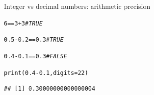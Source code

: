 \documentclass[xcolor=table,           xcolor=dvipsnames]{beamer}\usepackage[]{graphicx}\usepackage[]{color}
\makeatletter
\newcommand{\hlnum}[1]{\textcolor[rgb]{0,0,0}{#1}}
\newcommand{\hlcom}[1]{\textcolor[rgb]{0,0.392,0}{\textit{#1}}}
\newcommand{\hlopt}[1]{\textcolor[rgb]{0,0,0}{#1}}
\newcommand{\hlstd}[1]{\textcolor[rgb]{0,0,0}{#1}}
\newcommand{\hlkwc}[1]{\textcolor[rgb]{1,0,1}{#1}}
\newcommand{\hlkwd}[1]{\textcolor[rgb]{0,0,1}{#1}}
\newenvironment{kframe}{%
 \def\at@end@of@kframe{}%
 \ifinner\ifhmode%
  \def\at@end@of@kframe{\end{minipage}}%
  \begin{minipage}{\columnwidth}%
 \fi\fi%
 \def\FrameCommand##1{\hskip\@totalleftmargin \hskip-\fboxsep
 \colorbox{shadecolor}{##1}\hskip-\fboxsep
     \hskip-\linewidth \hskip-\@totalleftmargin \hskip\columnwidth}%
 \MakeFramed {\advance\hsize-\width
   \@totalleftmargin\z@ \linewidth\hsize
   \@setminipage}}%
 {\par\unskip\endMakeFramed%
 \at@end@of@kframe}
\newenvironment{knitrout}{}{} %
\makeatother
\begin{document}

\begin{frame}[fragile]{Integer vs decimal numbers: arithmetic precision}
\label{intnum}
\vspace{-1em}
\begin{knitrout}
\color{fgcolor}\begin{kframe}
\begin{alltt}
\hlnum{6}  \hlopt{==}  \hlnum{3} \hlopt{+} \hlnum{3}          \hlcom{# TRUE}
\end{alltt}
\end{kframe}
\end{knitrout}
\pause
\vspace{-1em}
\begin{knitrout}
\color{fgcolor}\begin{kframe}
\begin{alltt}
\hlnum{0.5} \hlopt{-} \hlnum{0.2}  \hlopt{==}  \hlnum{0.3}    \hlcom{# TRUE}
\end{alltt}
\end{kframe}
\end{knitrout}
\vspace{-1em}
\pause
\begin{knitrout}
\color{fgcolor}\begin{kframe}
\begin{alltt}
\hlnum{0.4} \hlopt{-} \hlnum{0.1}  \hlopt{==}  \hlnum{0.3}    \hlcom{# FALSE}
\end{alltt}
\end{kframe}
\end{knitrout}
\vspace{-1em}
\pause
\begin{knitrout}
\color{fgcolor}\begin{kframe}
\begin{alltt}
\hlkwd{print}\hlstd{(}\hlnum{0.4}\hlopt{-}\hlnum{0.1} \hlstd{,} \hlkwc{digits}\hlstd{=}\hlnum{22}\hlstd{)}
\end{alltt}
\begin{verbatim}
## [1] 0.30000000000000004
\end{verbatim}
\end{kframe}
\end{knitrout}
\vspace{-1em}
\pause
\begin{knitrout}

\end{knitrout}
\end{frame}
\end{document}
